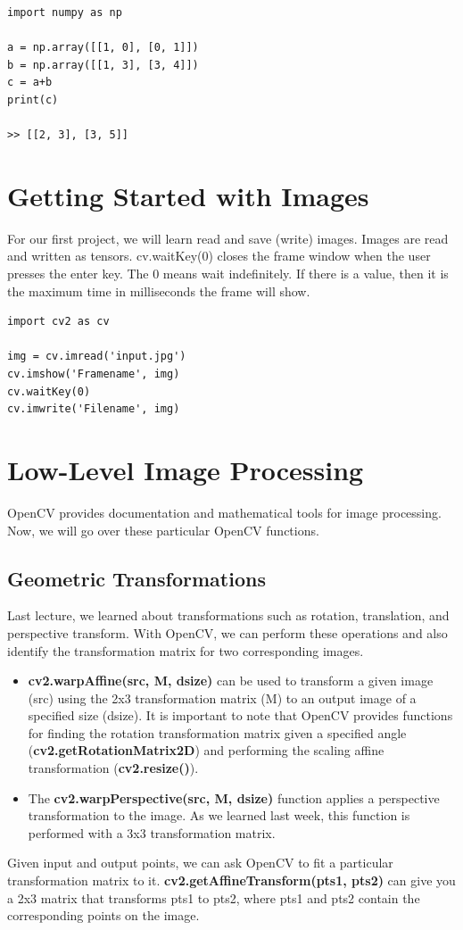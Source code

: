 \documentclass{article}
\begin{document}
\begin{lstlisting}
import numpy as np

a = np.array([[1, 0], [0, 1]])
b = np.array([[1, 3], [3, 4]])
c = a+b
print(c)

>> [[2, 3], [3, 5]]
\end{lstlisting}

\section{Getting Started with Images}
For our first project, we will learn read and save (write) images. Images are read and written as tensors. cv.waitKey(0) closes the frame window when the user presses the enter key. The 0 means wait indefinitely. If there is a value, then it is the maximum time in milliseconds the frame will show. 

\begin{lstlisting}
import cv2 as cv

img = cv.imread('input.jpg')
cv.imshow('Framename', img)
cv.waitKey(0)
cv.imwrite('Filename', img)

\end{lstlisting}

\section{Low-Level Image Processing}
OpenCV provides documentation and mathematical tools for image processing. Now, we will go over these particular OpenCV functions.  

\subsection{Geometric Transformations}
Last lecture, we learned about transformations such as rotation, translation, and perspective transform.  With OpenCV, we can perform these operations and also identify the transformation matrix for two corresponding images.

\begin{itemize}
    \item \textbf{cv2.warpAffine(src, M, dsize)} can be used to transform a given image (src) using the 2x3 transformation matrix (M) to an output image of a specified size (dsize).  It is important to note that OpenCV provides functions for finding the rotation transformation matrix given a specified angle (\textbf{cv2.getRotationMatrix2D}) and performing the scaling affine transformation (\textbf{cv2.resize()}).  
    
    \item The \textbf{cv2.warpPerspective(src, M, dsize)} function applies a perspective transformation to the image. As we learned last week, this function is performed with a 3x3 transformation matrix.
\end{itemize}
\noindent
Given input and output points, we can ask OpenCV to fit a particular transformation matrix to it.  \textbf{cv2.getAffineTransform(pts1, pts2)} can give you a 2x3 matrix that transforms pts1 to pts2, where pts1 and pts2 contain the corresponding points on the image.  
\end{document}
